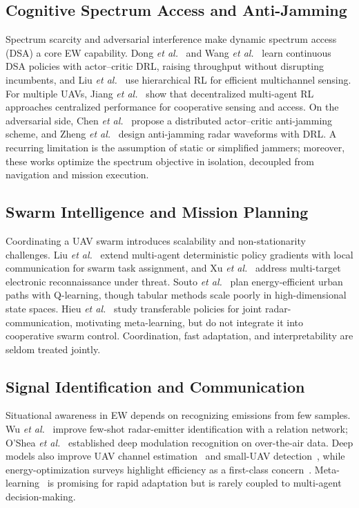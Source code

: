 \documentclass[journal]{IEEEtran}
\begin{document}
\subsection{Cognitive Spectrum Access and Anti-Jamming}
Spectrum scarcity and adversarial interference make dynamic spectrum access (DSA)
a core EW capability. Dong \emph{et al.}~\cite{dong2022dynamic} and Wang
\emph{et al.}~\cite{wang2022usage} learn continuous DSA policies with
actor--critic DRL, raising throughput without disrupting incumbents, and Liu
\emph{et al.}~\cite{liu2021dynamic} use hierarchical RL for efficient
multichannel sensing. For multiple UAVs, Jiang \emph{et al.}~\cite{jiang2022multiagent}
show that decentralized multi-agent RL approaches centralized performance for
cooperative sensing and access. On the adversarial side, Chen
\emph{et al.}~\cite{chen2022distributed} propose a distributed actor--critic
anti-jamming scheme, and Zheng \emph{et al.}~\cite{zheng2022airborne} design
anti-jamming radar waveforms with DRL. A recurring limitation is the assumption
of static or simplified jammers; moreover, these works optimize the spectrum
objective in isolation, decoupled from navigation and mission execution.

\subsection{Swarm Intelligence and Mission Planning}
Coordinating a UAV swarm introduces scalability and non-stationarity challenges.
Liu \emph{et al.}~\cite{liu2023task} extend multi-agent deterministic policy
gradients with local communication for swarm task assignment, and Xu
\emph{et al.}~\cite{xu2023pursuing} address multi-target electronic
reconnaissance under threat. Souto \emph{et al.}~\cite{souto2023uav} plan
energy-efficient urban paths with Q-learning, though tabular methods scale poorly
in high-dimensional state spaces. Hieu \emph{et al.}~\cite{hieu2022transferable}
study transferable policies for joint radar-communication, motivating
meta-learning, but do not integrate it into cooperative swarm control.
Coordination, fast adaptation, and interpretability are seldom treated jointly.

\subsection{Signal Identification and Communication}
Situational awareness in EW depends on recognizing emissions from few samples.
Wu \emph{et al.}~\cite{wu2023irelnet} improve few-shot radar-emitter
identification with a relation network; O'Shea \emph{et al.}~\cite{oshea2018over}
established deep modulation recognition on over-the-air data. Deep models also
improve UAV channel estimation~\cite{algburi2022channel} and small-UAV
detection~\cite{dewangan2023application}, while energy-optimization surveys
highlight efficiency as a first-class concern~\cite{abubakar2023survey}.
Meta-learning~\cite{finn2017model} is promising for rapid adaptation but is rarely
coupled to multi-agent decision-making.
\end{document}
